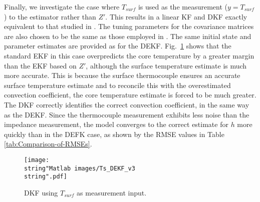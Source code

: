 \documentclass[journal, english]{IEEEtran}
\begin{document}
Finally, we investigate the case where $T_{surf}$ is used as the
measurement ($y = T_{surf}$) to the estimator rather than $Z'$. This results
in a linear KF and DKF exactly equivalent to that studied in \cite{Kim2014b}.
The tuning parameters for the covariance matrices are also chosen
to be the same as those employed in \cite{Kim2014b}. The same initial
state and parameter estimates are provided as for the DEKF. Fig.\ \ref{fig:DEKF-using-T_surf}
shows that the standard EKF in this case overpredicts the core temperature
by a greater margin than the EKF based on $Z'$, although the surface
temperature estimate is much more accurate. This is because the surface
thermocouple ensures an accurate surface temperature estimate
and to reconcile this with the overestimated convection coefficient,
the core temperature estimate is forced to be much greater. 
The DKF correctly identifies the correct convection coefficient, in the same way as the DEKF. Since
the thermocouple measurement exhibits less noise than the impedance
measurement, the model converges to the correct estimate for $h$
more quickly than in the DEFK case, as shown by the RMSE values
in Table \ref{tab:Comparison-of-RMSEs}.

\begin{figure}[h]
\begin{centering}
\texttt{[image: \\string"Matlab images/Ts\_DEKF\_v3\\string".pdf]}
\par\end{centering}
\caption{DKF using $T_{surf}$ as measurement input.\label{fig:DEKF-using-T_surf}}
\end{figure}
\end{document}
